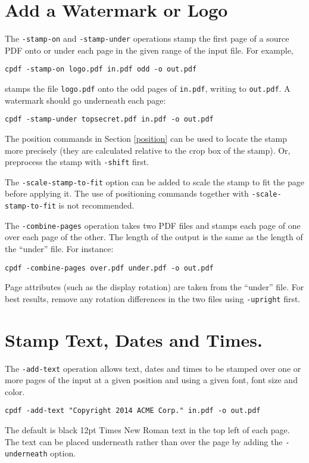 \documentclass{book}
\begin{document}
  \section{Add a Watermark or Logo}
  The \texttt{-stamp-on} and \texttt{-stamp-under} operations stamp the first
page of a source PDF onto or under each page in the given range of the input
file. For example,
  \begin{framed}
    \small\verb!cpdf -stamp-on logo.pdf in.pdf odd -o out.pdf!
  \end{framed}
\noindent stamps the file \texttt{logo.pdf} onto the odd pages of \texttt{in.pdf},
writing to \texttt{out.pdf}. A watermark should go underneath each page:
  \begin{framed}
    \small\verb!cpdf -stamp-under topsecret.pdf in.pdf -o out.pdf!
  \end{framed}

\noindent The position commands in Section \ref{position} can be used to locate the stamp more precisely (they are calculated relative to the crop box of the stamp). Or, preprocess the stamp with \texttt{-shift} first.

The \texttt{-scale-stamp-to-fit} option can be added to scale the stamp to fit the page before applying it. The use of positioning commands together with \texttt{-scale-stamp-to-fit} is not recommended.

  The \texttt{-combine-pages} operation takes two PDF files and stamps each
page of one over each page of the other. The length of the output is the same
as the length of the ``under'' file. For instance:
  \begin{framed}
    \small\verb!cpdf -combine-pages over.pdf under.pdf -o out.pdf!
  \end{framed}

\noindent Page attributes (such as the display rotation) are taken from the ``under''
file. For best results, remove any rotation differences in the two files using
\texttt{-upright} first.

  \section{Stamp Text, Dates and Times.}
  The \texttt{-add-text} operation allows text, dates and times to be stamped
over one or more pages of the input at a given position and using a given font,
font size and color.
  \begin{framed}
    \small\verb!cpdf -add-text "Copyright 2014 ACME Corp." in.pdf -o out.pdf!
  \end{framed}
  \noindent The default is black 12pt Times New Roman text in the top left of each page. The text can be placed underneath rather than over the page by adding the \texttt{-underneath} option.
  
\end{document}
